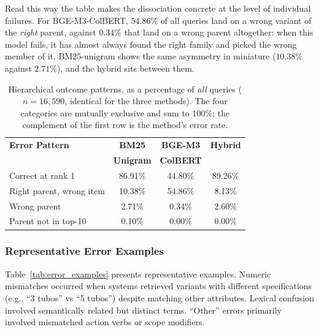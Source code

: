 \documentclass[preprint,12pt]{elsarticle}
\begin{document}
Read this way the table makes the dissociation concrete at the level of individual failures. For BGE-M3-ColBERT, $54.86\%$ of all queries land on a wrong variant of the \emph{right} parent, against $0.34\%$ that land on a wrong parent altogether: when this model fails, it has almost always found the right family and picked the wrong member of it. BM25-unigram shows the same asymmetry in miniature ($10.38\%$ against $2.71\%$), and the hybrid sits between them.

\begin{table}[htbp]
\centering
\caption{Hierarchical outcome patterns, as a percentage of \emph{all} queries ($n=16{,}590$, identical for the three methods). The four categories are mutually exclusive and sum to 100\%; the complement of the first row is the method's error rate.}
\label{tab:hierarchical_errors}
\begin{tabular}{lccc}
\toprule
\textbf{Error Pattern} & \textbf{BM25} & \textbf{BGE-M3} & \textbf{Hybrid} \\
 & \textbf{Unigram} & \textbf{ColBERT} & \\
\midrule
Correct at rank 1        & 86.91\% & 44.80\% & 89.26\% \\
\midrule
Right parent, wrong item & 10.38\% & 54.86\% & 8.13\%  \\
Wrong parent             & 2.71\%  & 0.34\%  & 2.60\%  \\
Parent not in top-10     & 0.10\%  & 0.00\%  & 0.00\%  \\
\bottomrule
\end{tabular}
\end{table}

\subsubsection{Representative Error Examples}

Table~\ref{tab:error_examples} presents representative examples. Numeric mismatches occurred when systems retrieved variants with different specifications (e.g., ``3 tubos'' vs ``5 tubos'') despite matching other attributes. Lexical confusion involved semantically related but distinct terms. ``Other'' errors primarily involved mismatched action verbs or scope modifiers.
\end{document}
